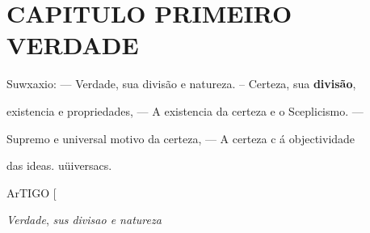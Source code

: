 
\chapter*{CAPITULO PRIMEIRO\\[0.3em]\large VERDADE}

 Suwxaxio: --- Verdade, sua divisão e natureza. -- Certeza, sua \textbf{divisão},

existencia e propriedades, --- A existencia da certeza e o Sceplicismo. ---

Supremo e universal motivo da certeza, --- A certeza c á objectividade

das ideas. uüiversacs.

ArTIGO [\textbar{}

\emph{Verdade}, \emph{sus divisao e natureza}


